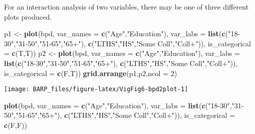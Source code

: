 \documentclass[]{article}
\newenvironment{Shaded}{\begin{snugshade}}{\end{snugshade}}
\newcommand{\KeywordTok}[1]{\textcolor[rgb]{0.13,0.29,0.53}{\textbf{#1}}}
\newcommand{\DataTypeTok}[1]{\textcolor[rgb]{0.13,0.29,0.53}{#1}}
\newcommand{\DecValTok}[1]{\textcolor[rgb]{0.00,0.00,0.81}{#1}}
\newcommand{\StringTok}[1]{\textcolor[rgb]{0.31,0.60,0.02}{#1}}
\newcommand{\NormalTok}[1]{#1}
\begin{document}
For an interaction analysis of two variables, there may be one of three
different plots produced.

\begin{Shaded}
\begin{Highlighting}[]
\NormalTok{p1 <-}\StringTok{ }\KeywordTok{plot}\NormalTok{(bpd,}
     \DataTypeTok{var_names =} \KeywordTok{c}\NormalTok{(}\StringTok{"Age"}\NormalTok{,}\StringTok{"Education"}\NormalTok{),}
     \DataTypeTok{var_labs =} \KeywordTok{list}\NormalTok{(}\KeywordTok{c}\NormalTok{(}\StringTok{"18-30"}\NormalTok{,}\StringTok{"31-50"}\NormalTok{,}\StringTok{"51-65"}\NormalTok{,}\StringTok{"65+"}\NormalTok{),}
                     \KeywordTok{c}\NormalTok{(}\StringTok{"LTHS"}\NormalTok{,}\StringTok{"HS"}\NormalTok{,}\StringTok{"Some Coll"}\NormalTok{,}\StringTok{"Coll+"}\NormalTok{)),}
     \DataTypeTok{is_categorical =} \KeywordTok{c}\NormalTok{(T,T))}
\NormalTok{p2 <-}\StringTok{ }\KeywordTok{plot}\NormalTok{(bpd,}
     \DataTypeTok{var_names =} \KeywordTok{c}\NormalTok{(}\StringTok{"Age"}\NormalTok{,}\StringTok{"Education"}\NormalTok{),}
     \DataTypeTok{var_labs =} \KeywordTok{list}\NormalTok{(}\KeywordTok{c}\NormalTok{(}\StringTok{"18-30"}\NormalTok{,}\StringTok{"31-50"}\NormalTok{,}\StringTok{"51-65"}\NormalTok{,}\StringTok{"65+"}\NormalTok{),}
                     \KeywordTok{c}\NormalTok{(}\StringTok{"LTHS"}\NormalTok{,}\StringTok{"HS"}\NormalTok{,}\StringTok{"Some Coll"}\NormalTok{,}\StringTok{"Coll+"}\NormalTok{)),}
     \DataTypeTok{is_categorical =} \KeywordTok{c}\NormalTok{(F,T))}
\KeywordTok{grid.arrange}\NormalTok{(p1,p2,}\DataTypeTok{ncol =} \DecValTok{2}\NormalTok{)}
\end{Highlighting}
\end{Shaded}

\begin{center}\texttt{[image: BARP\_files/figure-latex/VigFig6-bpd2plot-1]} \end{center}

\begin{Shaded}
\begin{Highlighting}[]
\KeywordTok{plot}\NormalTok{(bpd,}
     \DataTypeTok{var_names =} \KeywordTok{c}\NormalTok{(}\StringTok{"Age"}\NormalTok{,}\StringTok{"Education"}\NormalTok{),}
     \DataTypeTok{var_labs =} \KeywordTok{list}\NormalTok{(}\KeywordTok{c}\NormalTok{(}\StringTok{"18-30"}\NormalTok{,}\StringTok{"31-50"}\NormalTok{,}\StringTok{"51-65"}\NormalTok{,}\StringTok{"65+"}\NormalTok{),}
                     \KeywordTok{c}\NormalTok{(}\StringTok{"LTHS"}\NormalTok{,}\StringTok{"HS"}\NormalTok{,}\StringTok{"Some Coll"}\NormalTok{,}\StringTok{"Coll+"}\NormalTok{)),}
     \DataTypeTok{is_categorical =} \KeywordTok{c}\NormalTok{(F,F))}
\end{Highlighting}
\end{Shaded}
\end{document}
